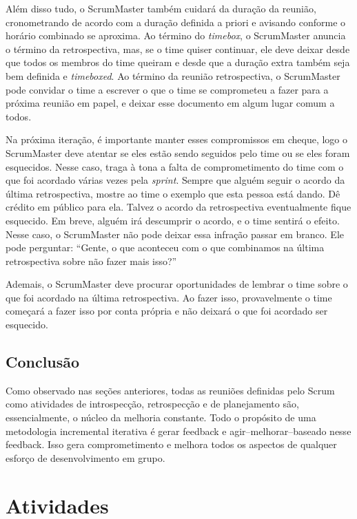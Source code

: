 \documentclass{iiufrgs}
\begin{document}
Além disso tudo, o ScrumMaster também cuidará da duração da reunião, cronometrando de acordo com a duração definida a priori e avisando conforme o horário combinado se aproxima. Ao término do \textit{timebox}, o ScrumMaster anuncia o término da retrospectiva, mas, se o time quiser continuar, ele deve deixar desde que todos os membros do time queiram e desde que a duração extra também seja bem definida e \textit{timeboxed}. Ao término da reunião retrospectiva, o ScrumMaster pode convidar o time a escrever o que o time se comprometeu a fazer para a próxima reunião em papel, e deixar esse documento em algum lugar comum a todos.

Na próxima iteração, é importante manter esses compromissos em cheque, logo o ScrumMaster deve atentar se eles estão sendo seguidos pelo time ou se eles foram esquecidos. Nesse caso, traga à tona a falta de comprometimento do time com o que foi acordado várias vezes pela \textit{sprint}. Sempre que alguém seguir o acordo da última retrospectiva, mostre ao time o exemplo que esta pessoa está dando. Dê crédito em público para ela. Talvez o acordo da retrospectiva eventualmente fique esquecido. Em breve, alguém irá descumprir o acordo, e o time sentirá o efeito. Nesse caso, o ScrumMaster não pode deixar essa infração passar em branco. Ele pode perguntar: \enquote{Gente, o que aconteceu com o que combinamos na última retrospectiva sobre não fazer mais isso?}

Ademais, o ScrumMaster deve procurar oportunidades de lembrar o time sobre o que foi acordado na última retrospectiva. Ao fazer isso, provavelmente o time começará a fazer isso por conta própria e não deixará o que foi acordado ser esquecido.

\section{Conclusão}

Como observado nas seções anteriores, todas as reuniões definidas pelo Scrum como atividades de introspecção, retrospecção e de planejamento são, essencialmente, o núcleo da melhoria constante. Todo o propósito de uma metodologia incremental iterativa é gerar feedback e agir--melhorar--baseado nesse feedback. Isso gera comprometimento e melhora todos os aspectos de qualquer esforço de desenvolvimento em grupo.


%

\chapter{Atividades}
\end{document}

